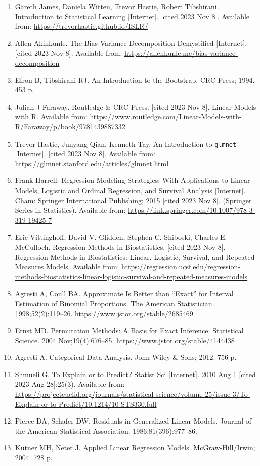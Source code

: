 \documentclass[
  letterpaper,
  DIV=11,
  numbers=noendperiod]{scrreport}
\begin{document}

\begin{enumerate}
\def\labelenumi{\arabic{enumi}.}
\item
  Gareth James, Daniela Witten, Trevor Hastie, Robert Tibshirani.
  Introduction to Statistical Learning {[}Internet{]}. {[}cited 2023 Nov
  8{]}. Available from: \url{https://trevorhastie.github.io/ISLR/}
\item
  Allen Akinkunle. The Bias-Variance Decomposition Demystified
  {[}Internet{]}. {[}cited 2023 Nov 8{]}. Available from:
  \url{https://allenkunle.me/bias-variance-decomposition}
\item
  Efron B, Tibshirani RJ. An Introduction to the Bootstrap. CRC Press;
  1994. 453 p.~
\item
  Julian J Faraway. Routledge \& CRC Press. {[}cited 2023 Nov 8{]}.
  Linear Models with R. Available from:
  \url{https://www.routledge.com/Linear-Models-with-R/Faraway/p/book/9781439887332}
\item
  Trevor Hastie, Junyang Qian, Kenneth Tay. An Introduction to
  \texttt{glmnet} {[}Internet{]}. {[}cited 2023 Nov 8{]}. Available
  from: \url{https://glmnet.stanford.edu/articles/glmnet.html}
\item
  Frank Harrell. Regression Modeling Strategies: With Applications to
  Linear Models, Logistic and Ordinal Regression, and Survival Analysis
  {[}Internet{]}. Cham: Springer International Publishing; 2015 {[}cited
  2023 Nov 8{]}. (Springer Series in Statistics). Available from:
  \url{https://link.springer.com/10.1007/978-3-319-19425-7}
\item
  Eric Vittinghoff, David V. Glidden, Stephen C. Shiboski, Charles E.
  McCulloch. Regression Methods in Biostatistics. {[}cited 2023 Nov
  8{]}. Regression Methods in Biostatistics: Linear, Logistic, Survival,
  and Repeated Measures Models. Available from:
  \url{https://regression.ucsf.edu/regression-methods-biostatistics-linear-logistic-survival-and-repeated-measures-models}
\item
  Agresti A, Coull BA. Approximate Is Better than ``Exact'' for Interval
  Estimation of Binomial Proportions. The American Statistician.
  1998;52(2):119--26. \url{https://www.jstor.org/stable/2685469}
\item
  Ernst MD. Permutation Methods: A Basis for Exact Inference.
  Statistical Science. 2004 Nov;19(4):676--85.
  \url{https://www.jstor.org/stable/4144438}
\item
  Agresti A. Categorical Data Analysis. John Wiley \& Sons; 2012. 756
  p.~
\item
  Shmueli G. To Explain or to Predict? Statist Sci {[}Internet{]}. 2010
  Aug 1 {[}cited 2023 Aug 28{]};25(3). Available from:
  \url{https://projecteuclid.org/journals/statistical-science/volume-25/issue-3/To-Explain-or-to-Predict/10.1214/10-STS330.full}
\item
  Pierce DA, Schafer DW. Residuals in Generalized Linear Models. Journal
  of the American Statistical Association. 1986;81(396):977--86.
\item
  Kutner MH, Neter J. Applied Linear Regression Models.
  McGraw-Hill/Irwin; 2004. 728 p.~
\end{enumerate}
\end{document}
